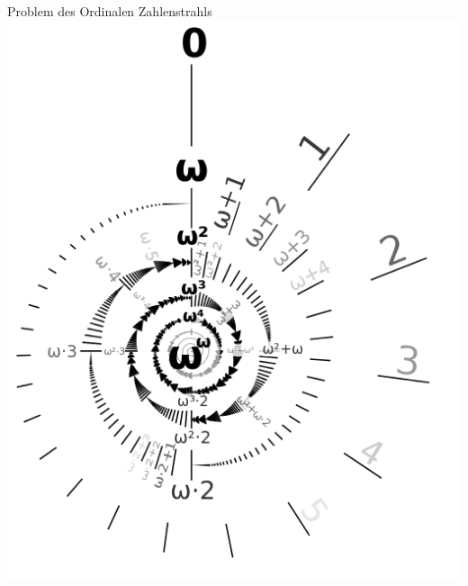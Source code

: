 \begin{frame}[c]{Problem des Ordinalen Zahlenstrahls}
     {
        \hspace{2cm}
        \includegraphics[height=0.8\textheight]{proseminar/images/ordinal}
    }

\end{frame}



